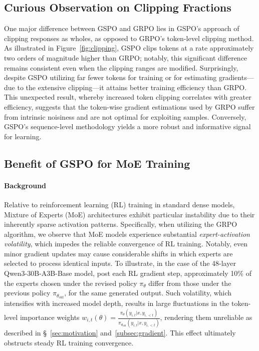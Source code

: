 \subsection{Curious Observation on Clipping Fractions}

One major difference between GSPO and GRPO lies in GSPO’s approach of clipping responses as wholes, as opposed to GRPO’s token-level clipping method. As illustrated in Figure~\ref{fig:clipping}, GSPO clips tokens at a rate approximately two orders of magnitude higher than GRPO; notably, this significant difference remains consistent even when the clipping ranges are modified. Surprisingly, despite GSPO utilizing far fewer tokens for training or for estimating gradients—due to the extensive clipping—it attains better training efficiency than GRPO. This unexpected result, whereby increased token clipping correlates with greater efficiency, suggests that the token-wise gradient estimations used by GRPO suffer from intrinsic noisiness and are not optimal for exploiting samples. Conversely, GSPO’s sequence-level methodology yields a more robust and informative signal for learning.

\subsection{Benefit of GSPO for MoE Training}
\label{subsec:routing_replay}

\paragraph{Background}
Relative to reinforcement learning (RL) training in standard dense models, Mixture of Experts (MoE) architectures exhibit particular instability due to their inherently sparse activation patterns. Specifically, when utilizing the GRPO algorithm, we observe that MoE models experience substantial \textit{expert-activation volatility}, which impedes the reliable convergence of RL training. Notably, even minor gradient updates may cause considerable shifts in which experts are selected to process identical inputs. To illustrate, in the case of the 48-layer Qwen3-30B-A3B-Base model, post each RL gradient step, approximately 10\% of the experts chosen under the revised policy $\pi_{\theta}$ differ from those under the previous policy $\pi_{\theta_\text{old}}$, for the same generated output. Such volatility, which intensifies with increased model depth, results in large fluctuations in the token-level importance weights $w_{i,t}(\theta) = \frac{ \pi_{\theta} (y_{i,t} | x, y_{i,<t}) }{ \pi_{\theta_\text{old}} (y_{i,t} | x,y_{i,<t})}$, rendering them unreliable as described in \S~\ref{sec:motivation} and~\ref{subsec:gradient}. This effect ultimately obstructs steady RL training convergence.

